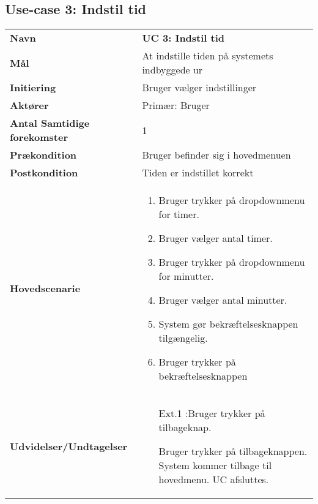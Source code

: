 \subsection{Use-case 3: Indstil tid}
\begin{tabular}{>{\bfseries}p{100pt} p{300pt}}
	Navn & \bfseries{UC 3: Indstil tid} \\
		Mål & At indstille tiden på systemets indbyggede ur\\
	Initiering & Bruger vælger indstillinger \\
	Aktører & Primær: Bruger \\
	Antal Samtidige forekomster & 1 \\
	Prækondition & Bruger befinder sig i hovedmenuen \\
	Postkondition & Tiden er indstillet korrekt \\
	Hovedscenarie & \begin{enumerate}
		\item Bruger trykker på dropdownmenu for timer.
		\item Bruger vælger antal timer.
		\item Bruger trykker på dropdownmenu for minutter.
		\item Bruger vælger antal minutter.
		\item System gør bekræftelsesknappen tilgængelig.
		\item Bruger trykker på bekræftelsesknappen 
		\subitem [Ext. 1:Bruger trykker på tilbageknap.]
		
	\end{enumerate} \\
	Udvidelser/Undtagelser & 
	\begin{enumerate}{}{}
	\item[Ext.1]:Bruger trykker på tilbageknap.
	
		\subitem[1.1] Bruger trykker på tilbageknappen.
		\subitem[1.2] System kommer tilbage til hovedmenu.	 
		\subitem[1.3]UC afsluttes. \newline 
	\end{enumerate}
\end{tabular}